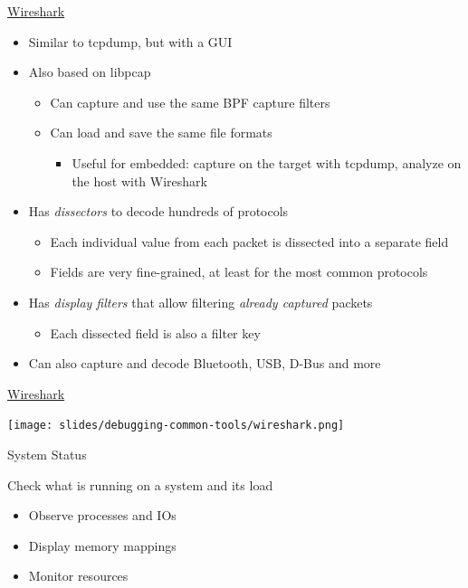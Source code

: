 \begin{frame}{\href{https://www.wireshark.org/}{Wireshark}}
  \begin{itemize}
  \item Similar to tcpdump, but with a GUI
  \item Also based on libpcap
    \begin{itemize}
    \item Can capture and use the same BPF capture filters
    \item Can load and save the same file formats
      \begin{itemize}
      \item Useful for embedded: capture on the target with tcpdump,
        analyze on the host with Wireshark
      \end{itemize}
    \end{itemize}
  \item Has {\em dissectors} to decode hundreds of protocols
    \begin{itemize}
    \item Each individual value from each packet is dissected into a
      separate field
    \item Fields are very fine-grained, at least for the most common
      protocols
    \end{itemize}
  \item Has {\em display filters} that allow filtering {\em already
    captured} packets
    \begin{itemize}
    \item Each dissected field is also a filter key
    \end{itemize}
  \item Can also capture and decode Bluetooth, USB, D-Bus and more
  \end{itemize}
\end{frame}

\begin{frame}{\href{https://www.wireshark.org/}{Wireshark}}
  \begin{center}
    \texttt{[image: slides/debugging-common-tools/wireshark.png]}
  \end{center}
\end{frame}

\setuplabframe
{System Status}
{
  Check what is running on a system and its load
  \begin{itemize}
    \item Observe processes and IOs
    \item Display memory mappings
    \item Monitor resources
  \end{itemize}
}
